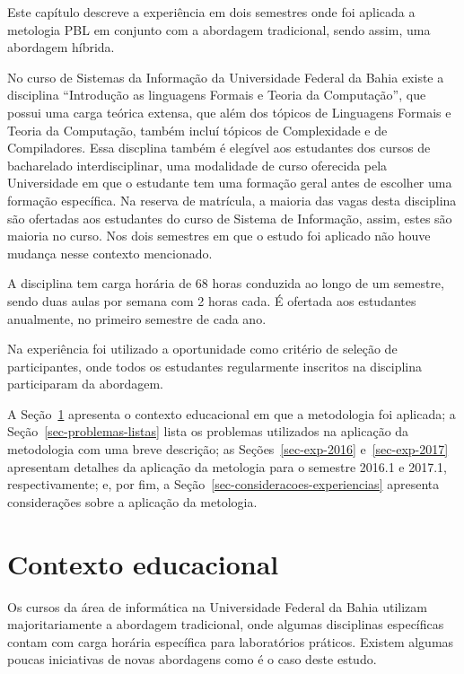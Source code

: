 
\label{cap-experiencia}
\acresetall

Este capítulo descreve a experiência em dois semestres onde foi aplicada a metologia PBL
em conjunto com a abordagem tradicional, sendo assim, uma abordagem híbrida.

No curso de Sistemas da Informação da Universidade Federal da Bahia existe
a disciplina ``Introdução as linguagens Formais e Teoria da Computação'',
que possui uma carga teórica extensa, que além dos tópicos de Linguagens Formais e Teoria
da Computação, também incluí tópicos de Complexidade e de Compiladores.
Essa discplina também é elegível aos estudantes dos cursos de bacharelado
interdisciplinar, uma modalidade de curso oferecida pela Universidade
em que o estudante tem uma formação geral antes de escolher
uma formação específica.
Na reserva de matrícula, a maioria das vagas desta disciplina são ofertadas aos
estudantes do curso de Sistema de Informação, assim, estes são maioria no curso.
Nos dois semestres em que o estudo foi aplicado não houve mudança nesse
contexto mencionado.

A disciplina tem carga horária de 68 horas conduzida ao longo de um semestre, sendo duas
aulas por semana com 2 horas cada.
É ofertada aos estudantes anualmente, no primeiro semestre de cada ano.

Na experiência foi utilizado a oportunidade como critério de seleção de participantes, onde todos os
estudantes regularmente inscritos na disciplina participaram da abordagem.

A Seção~\ref{sec-contexto-educacional} apresenta o contexto
educacional em que a metodologia foi aplicada;
a Seção~\ref{sec-problemas-listas} lista os problemas utilizados
na aplicação da metodologia com uma breve
descrição;
as Seções~\ref{sec-exp-2016} e~\ref{sec-exp-2017}
apresentam detalhes da aplicação da metologia para o semestre 2016.1 e 2017.1, respectivamente;
e, por fim, a Seção~\ref{sec-consideracoes-experiencias} apresenta
considerações sobre a aplicação da metologia.

\section{Contexto educacional}
\label{sec-contexto-educacional}
Os cursos da área de informática na Universidade Federal da Bahia
utilizam majoritariamente a abordagem tradicional, onde
algumas disciplinas específicas contam com carga horária específica
para laboratórios práticos.
Existem algumas poucas iniciativas de novas abordagens como é
o caso deste estudo.

